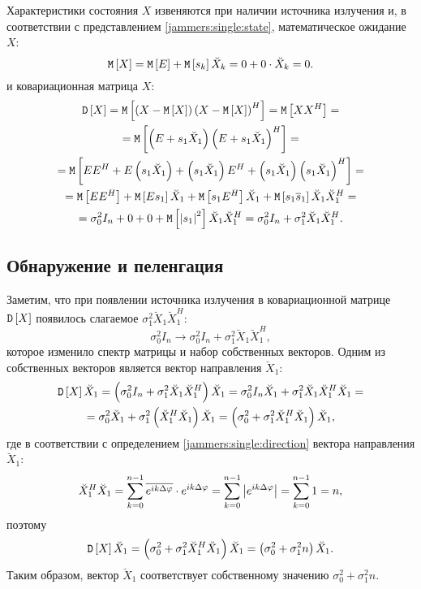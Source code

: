 Характеристики состояния $X$ извеняются при наличии источника излучения и, в соответствии с представлением \eqref{jammers:single:state}, математическое ожидание
$X$:
\[
    \mathtt{M} \left [ X \right ]
    = \mathtt{M} \left [ E \right ] + \mathtt{M} \left [ s_k \right ] \breve{X}_k
    = 0 + 0 \cdot \breve{X}_k
    = 0.
\]
и ковариационная матрица $X$:
\begin{multline*}
    \mathtt{D} \left [ X \right ]
    = \mathtt{M} \left [ \left ( X - \mathtt{M} \left [ X \right ] \right ) \left ( X - \mathtt{M} \left [ X \right ] \right )^H \right ]
    = \mathtt{M} \left [ X X^H \right ] = \\
    = \mathtt{M} \left [ \left ( E + s_1 \breve{X}_1 \right ) \left ( E + s_1 \breve{X}_1 \right )^H \right ] = \\
    = \mathtt{M} \left [ E E^H + E \left ( s_1 \breve{X}_1 \right ) + \left ( s_1 \breve{X}_1 \right ) E^H + \left ( s_1 \breve{X}_1 \right ) \left ( s_1 \breve{X}_1 \right )^H \right ] = \\
    = \mathtt{M} \left [ E E^H \right ] + \mathtt{M} \left [ E s_1 \right ] \breve{X}_1 + \mathtt{M} \left [ s_1 E^H \right ] \breve{X}_1 + \mathtt{M} \left [ s_1 \overline{s}_1 \right ] \breve{X}_1 \breve{X}_1^H = \\
    = \sigma_0^2 I_n + 0 + 0 + \mathtt{M} \left [ \left | s_1 \right |^2 \right ] \breve{X}_1 \breve{X}_1^H
    = \sigma_0^2 I_n + \sigma_1^2 \breve{X}_1 \breve{X}_1^H
    .
\end{multline*}

\subsection{Обнаружение и пеленгация}

Заметим, что при появлении источника излучения в ковариационной матрице $\mathtt{D} \left [ X \right ]$ появилось слагаемое $\sigma_1^2 \breve{X}_1 \breve{X}_1^H$:
\[
    \sigma_0^2 I_n \rightarrow \sigma_0^2 I_n + \sigma_1^2 \breve{X}_1 \breve{X}_1^H ,
\]
которое изменило спектр матрицы и набор собственных векторов. Одним из собственных векторов является вектор направления $\breve{X}_1$:
\begin{multline*}
    \mathtt{D} \left [ X \right ] \breve{X}_1
    = \left ( \sigma_0^2 I_n + \sigma_1^2 \breve{X}_1 \breve{X}_1^H \right ) \breve{X}_1
    = \sigma_0^2 I_n \breve{X}_1 + \sigma_1^2 \breve{X}_1 \breve{X}_1^H \breve{X}_1 = \\
    = \sigma_0^2 \breve{X}_1 + \sigma_1^2 \left ( \breve{X}_1^H \breve{X}_1 \right ) \breve{X}_1
    = \left ( \sigma_0^2 + \sigma_1^2 \breve{X}_1^H \breve{X}_1 \right ) \breve{X}_1 ,
\end{multline*}
где в соответствии с определением \eqref{jammers:single:direction} вектора направления $\breve{X}_1$:
\begin{equation}
    \label{jammers:single:direction_self_product}
    \breve{X}_1^H \breve{X}_1
    = \sum_{k=0}^{n-1} \overline{e^{i k \Delta \varphi}} \cdot e^{i k \Delta \varphi}
    = \sum_{k=0}^{n-1} \left | e^{i k \Delta \varphi} \right |
    = \sum_{k=0}^{n-1} 1
    = n ,
\end{equation}
поэтому
\[
    \mathtt{D} \left [ X \right ] \breve{X}_1
    = \left ( \sigma_0^2 + \sigma_1^2 \breve{X}_1^H \breve{X}_1 \right ) \breve{X}_1
    = \left ( \sigma_0^2 + \sigma_1^2 n \right ) \breve{X}_1 .
\]
Таким образом, вектор $\breve{X}_1$ соответствует собственному значению $\sigma_0^2 + \sigma_1^2 n$.

